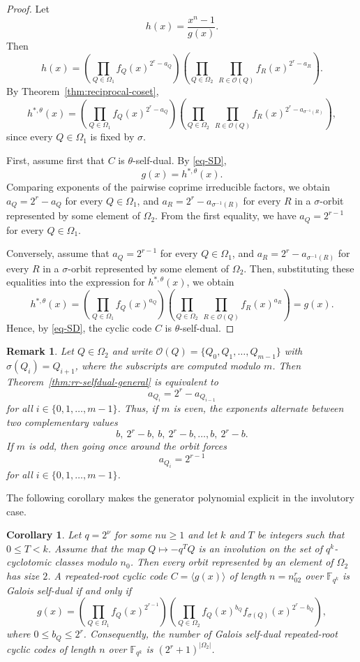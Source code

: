 \documentclass[pdflatex,sn-mathphys-num]{sn-jnl}%
\theoremstyle{thmstyleone}%
\newtheorem{corollary}[theorem]{Corollary}%
\theoremstyle{thmstyletwo}%
\newtheorem{remark}{Remark}%
\theoremstyle{thmstylethree}%
\newcommand{\F}{\mathbb{F}}
\begin{document}
\begin{proof}
Let
\[
h(x)=\frac{x^n-1}{g(x)}.
\]
Then
\[
h(x)=
\left(\prod_{Q\in \Omega_1} f_Q(x)^{2^r-a_Q}\right)
\left(\prod_{Q\in \Omega_2}\ \prod_{R\in \mathcal O(Q)} f_R(x)^{2^r-a_R}\right).
\]
By Theorem~\ref{thm:reciprocal-coset},
\[
h^{\ast,\theta}(x)=
\left(\prod_{Q\in \Omega_1} f_Q(x)^{2^r-a_Q}\right)
\left(\prod_{Q\in \Omega_2}\ \prod_{R\in \mathcal O(Q)} f_R(x)^{2^r-a_{\sigma^{-1}(R)}}\right),
\]
since every $Q\in\Omega_1$ is fixed by $\sigma$.

First,  assume first that $C$ is $\theta$-self-dual. By \eqref{eq-SD},
\[
g(x)=h^{\ast,\theta}(x).
\]
Comparing exponents of the pairwise coprime irreducible factors, we obtain
$
a_Q=2^r-a_Q$ for every $Q\in\Omega_1$, and 
$
a_R=2^r-a_{\sigma^{-1}(R)}$ 
 for every $R$
in  a $\sigma$-orbit represented by some element of $\Omega_2$. From the first equality, we have 
$ 
a_Q=2^{r-1}$ for every $ Q\in\Omega_1.
$

Conversely, assume that
$
a_Q=2^{r-1} $ for every $Q\in\Omega_1$,
and
$
a_R=2^r-a_{\sigma^{-1}(R)}$ 
 for every $R$
in  a $\sigma$-orbit represented by some element of $\Omega_2$. Then, substituting these equalities into the expression for $h^{\ast,\theta}(x)$, we obtain
\[
h^{\ast,\theta}(x)=
\left(\prod_{Q\in \Omega_1} f_Q(x)^{a_Q}\right)
\left(\prod_{Q\in \Omega_2}\ \prod_{R\in \mathcal O(Q)} f_R(x)^{a_R}\right)
=
g(x).
\]
Hence, by \eqref{eq-SD}, the cyclic code $C$ is $\theta$-self-dual.
\end{proof}
 

\begin{remark}\label{rem:orbit-parity}
Let $Q\in\Omega_2$ and write
$
\mathcal O(Q)=\{Q_0,Q_1,\dots,Q_{m-1}\}
$
with
$
\sigma(Q_i)=Q_{i+1}
$, where the subscripts are computed modulo $m$.
Then Theorem~\ref{thm:rr-selfdual-general} is equivalent to
\[
a_{Q_i}=2^r-a_{Q_{i-1}}
\]  {for all } $i\in \{0,1,\dots, m-1\}$. 
Thus, if $m$ is even, the exponents alternate between two complementary values
\[
b,\ 2^r-b,\ b,\ 2^r-b,\dots, b,\ 2^r-b.
\]
If $m$ is odd, then going once around the orbit forces
\[
a_{Q_i}=2^{r-1} 
\]{for all } $i\in \{0,1,\dots, m-1\}$.
\end{remark}

The following corollary makes the generator polynomial explicit in the involutory case.

 
\begin{corollary}\label{cor:rr-selfdual-involutory} Let  $
q=2^\nu $ for some $nu\ge 1$ and let $k$ and $T$ be integers such that $0\leq T<k$.
Assume that the map
$
Q\mapsto -q^TQ
$
is an involution on the set of $q^k$-cyclotomic classes modulo $n_0$. Then every orbit represented by an element of $\Omega_2$ has size $2$. A repeated-root cyclic code $
C=\langle g(x)\rangle$ 
of length $n=n_02^r$ over $\F_{q^k}$ is Galois self-dual if and only if
\[
g(x)=
\left(\prod_{Q\in \Omega_1} f_Q(x)^{2^{r-1}}\right)
\left(\prod_{Q\in \Omega_2} f_Q(x)^{b_Q}f_{\sigma(Q)}(x)^{2^r-b_Q}\right),
\] where $0\le b_Q\le 2^r$.
Consequently, the number of Galois self-dual repeated-root cyclic codes of length $n$ over $\F_{q^k}$ is
$
(2^r+1)^{|\Omega_2|}$.
\end{corollary}
\end{document}
